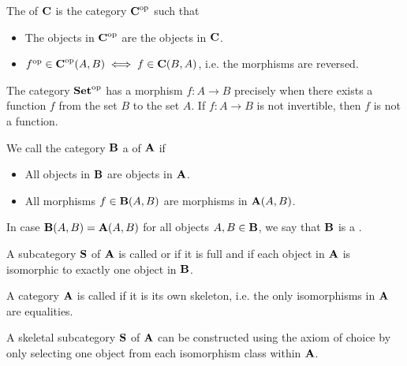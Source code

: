 \begin{definition}\label{def:opposite_category}\cite[construction 1.1.9]{Leinster2014}
  The  of $\operatorname{\mathbf{C}}$ is the category $\operatorname{\mathbf{C}}^{\operatorname{op}}$ such that
  \begin{itemize}
    \item The objects in $\operatorname{\mathbf{C}}^{\operatorname{op}}$ are the objects in $\operatorname{\mathbf{C}}$.
    \item $f^{\operatorname{op}} \in \operatorname{\mathbf{C}}^{\operatorname{op}}(A, B) \iff f \in \operatorname{\mathbf{C}}(B, A)$, i.e. the morphisms are reversed.
  \end{itemize}
\end{definition}

\begin{example}
  The category $\operatorname{\mathbf{Set}}^{\operatorname{op}}$ has a morphism $f: A \to B$ precisely when there exists a function $f$ from the set $B$ to the set $A$. If $f: A \to B$ is not invertible, then $f$ is not a function.
\end{example}

\begin{definition}\label{def:subcategory}\cite[definition 1.2.18]{Leinster2014}
  We call the category $\operatorname{\mathbf{B}}$ a  of $\operatorname{\mathbf{A}}$ if
  \begin{itemize}
    \item All objects in $\operatorname{\mathbf{B}}$ are objects in $\operatorname{\mathbf{A}}$.
    \item All morphisms $f \in \operatorname{\mathbf{B}}(A, B)$ are morphisms in $\operatorname{\mathbf{A}}(A, B)$.
  \end{itemize}

  In case $\operatorname{\mathbf{B}}(A, B) = \operatorname{\mathbf{A}}(A, B)$ for all objects $A, B \in \operatorname{\mathbf{B}}$, we say that $\operatorname{\mathbf{B}}$ is a .
\end{definition}

\begin{definition}\label{def:skeletal_category}\cite[91]{MacLane1994}
  A subcategory $\operatorname{\mathbf{S}}$ of $\operatorname{\mathbf{A}}$ is called  or  if it is full and if each object in $\operatorname{\mathbf{A}}$ is isomorphic to exactly one object in $\operatorname{\mathbf{B}}$.

  A category $\operatorname{\mathbf{A}}$ is called  if it is its own skeleton, i.e. the only isomorphisms in $\operatorname{\mathbf{A}}$ are equalities.
\end{definition}

\begin{note}\label{note:skeletal_subcategory_exists}
   A skeletal subcategory $\operatorname{\mathbf{S}}$ of $\operatorname{\mathbf{A}}$ can be constructed using the axiom of choice by only selecting one object from each isomorphism class within $\operatorname{\mathbf{A}}$.
\end{note}

